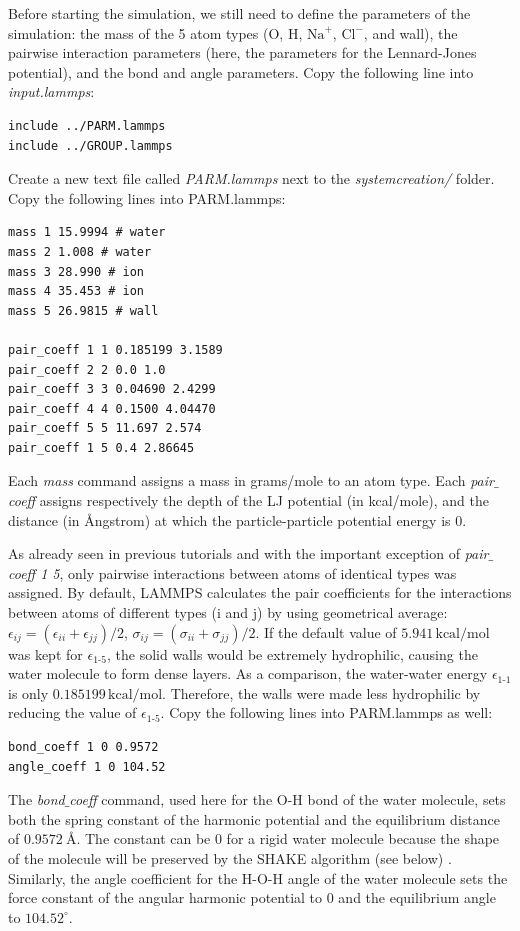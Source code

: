 \documentclass[9pt,tutorial]{livecoms}
\begin{document}
Before starting the simulation, we still need to define the parameters of the simulation: the mass of the 5 atom types (O, H, $\text{Na}^+$, $\text{Cl}^-$, and wall), the pairwise interaction parameters (here, the parameters for the Lennard-Jones potential), and the bond and angle parameters. Copy the following line into \textit{input.lammps}:
{\normalsize \begin{verbatim}
include ../PARM.lammps
include ../GROUP.lammps
\end{verbatim}}
Create a new text file called \textit{PARM.lammps} next to the \textit{systemcreation/} folder. Copy the following lines into PARM.lammps:
{\normalsize \begin{verbatim}
mass 1 15.9994 # water
mass 2 1.008 # water
mass 3 28.990 # ion
mass 4 35.453 # ion
mass 5 26.9815 # wall

pair_coeff 1 1 0.185199 3.1589 
pair_coeff 2 2 0.0 1.0
pair_coeff 3 3 0.04690 2.4299
pair_coeff 4 4 0.1500 4.04470
pair_coeff 5 5 11.697 2.574
pair_coeff 1 5 0.4 2.86645
\end{verbatim}}
Each \textit{mass} command assigns a mass in grams/mole to an atom type. Each \textit{pair$\_$coeff} assigns respectively the depth of the LJ potential (in kcal/mole), and the distance (in Ångstrom) at which the particle-particle potential energy is 0.

As already seen in previous tutorials and with the important exception of \textit{pair$\_$coeff 1 5}, only pairwise interactions between atoms of identical types was assigned. By default, LAMMPS calculates the pair coefficients for the interactions between atoms of different types (i and j) by using geometrical average: $\epsilon_{ij} = (\epsilon_{ii} + \epsilon_{jj})/2$,  $\sigma_{ij} = (\sigma_{ii} + \sigma_{jj})/2$. If the default value of $5.941\,\text{kcal/mol}$ was kept for $\epsilon_\text{1-5}$, the solid walls would be extremely hydrophilic, causing the water molecule to form dense layers. As a comparison, the water-water energy $\epsilon_\text{1-1}$ is only $0.185199\,\text{kcal/mol}$. Therefore, the walls were made less hydrophilic by reducing the value of $\epsilon_\text{1-5}$. Copy the following lines into PARM.lammps as well:
{\normalsize \begin{verbatim}   
bond_coeff 1 0 0.9572
angle_coeff 1 0 104.52
\end{verbatim}}
The \textit{bond$\_$coeff} command, used here for the O-H bond of the water molecule, sets both the spring constant of the harmonic potential and the equilibrium distance of $0.9572~\text{\AA{}}$. The constant can be 0 for a rigid water molecule because the shape of the molecule will be preserved by the SHAKE algorithm (see below) \cite{ryckaert1977numerical, andersen1983rattle}. Similarly, the angle coefficient for the H-O-H angle of the water molecule sets the force constant of the angular harmonic potential to 0 and the equilibrium angle to $104.52^\circ$.
\end{document}
